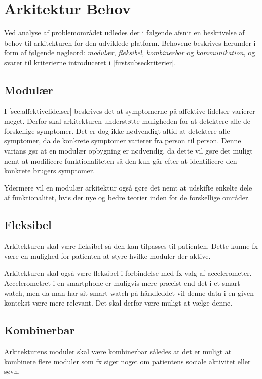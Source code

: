 \section{Arkitektur Behov}\label{arkitekturkrav}
Ved analyse af problemområdet udledes der i følgende afsnit en beskrivelse af behov til arkitekturen for den udviklede platform.
Behovene beskrives herunder i form af følgende nøgleord: \textit{modulær}, \textit{fleksibel}, \textit{kombinerbar} og \textit{kommunikation}, og svarer til kriterierne introduceret i \cref{firstsubseckriterier}.

\subsection{Modulær}\label{arkitekturkrav::modulaer}
I \cref{sec:affektivelidelser} beskrives det at symptomerne på affektive lidelser varierer meget.
Derfor skal arkitekturen understøtte muligheden for at detektere alle de forskellige symptomer.
Det er dog ikke nødvendigt altid at detektere alle symptomer, da de konkrete symptomer varierer fra person til person.
Denne varians gør at en modulær opbygning er nødvendig, da dette vil gøre det muligt nemt at modificere funktionaliteten så den kun går efter at identificere den konkrete brugers symptomer.

Ydermere vil en modulær arkitektur også gøre det nemt at udskifte enkelte dele af funktionalitet, hvis der nye og bedre teorier inden for de forskellige områder.

\subsection{Fleksibel}\label{arkitekturkrav::fleksibel}
Arkitekturen skal være fleksibel så den kan tilpasses til patienten.
Dette kunne fx være en mulighed for patienten at styre hvilke moduler der aktive.

Arkitekturen skal også være fleksibel i forbindelse med fx valg af accelerometer.
Accelerometret i en smartphone er muligvis mere præcist end det i et smart watch, men da man har sit smart watch på håndleddet vil denne data i en given kontekst være mere relevant.
Det skal derfor være muligt at vælge denne.

\subsection{Kombinerbar}\label{arkitekturkrav::kombinerbar}
Arkitekturens moduler skal være kombinerbar således at det er muligt at kombinere flere moduler som fx siger noget om patientens sociale aktivitet eller søvn.

